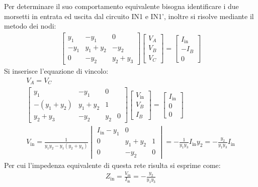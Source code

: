 \documentclass{article}
\numberwithin{equation}{subsection}
\begin{document}
Per determinare il suo comportamento equivalente bisogna identificare i due morsetti in entrata ed uscita dal circuito IN1 e IN1', inoltre si risolve 
mediante il metodo dei nodi:
\begin{gather*}
    \begin{bmatrix}
        y_1&-y_1&0\\-y_1&y_1+y_2&-y_2\\0&-y_2&y_2+y_3
    \end{bmatrix}\begin{bmatrix}
        V_A\\V_B\\V_C
    \end{bmatrix}=\begin{bmatrix}
        I_\mathrm{in}\\-I_B\\0
    \end{bmatrix}
\end{gather*}
Si inserisce l'equazione di vincolo:
\begin{gather*}
    V_A=V_C\\
    \begin{bmatrix}
        y_1&-y_1&0\\-(y_1+y_2)&y_1+y_2&1\\y_2+y_3&-y_2&y_2&0
    \end{bmatrix}\begin{bmatrix}
        V_\mathrm{in}\\V_B\\I_B
    \end{bmatrix}=\begin{bmatrix}
        I_\mathrm{in}\\0\\0
    \end{bmatrix}\\
    V_\mathrm{in}=\displaystyle\frac{1}{y_1y_2-y_1(y_2+y_3)}\begin{vmatrix}
        I_\mathrm{in}-y_1&0\\0&y_1+y_2&1\\0&-y_2&0
    \end{vmatrix}=-\frac{1}{y_1y_3}I_\mathrm{in}y_2=-\frac{y_2}{y_1y_3}I_\mathrm{in}
\end{gather*}
Per cui l'impedenza equivalente di questa rete risulta si esprime come:
\begin{gather*}
    Z_\mathrm{in}=\displaystyle\frac{V_\mathrm{in}}{I_\mathrm{in}}=-\frac{y_2}{y_1y_3}
\end{gather*}
\end{document}
